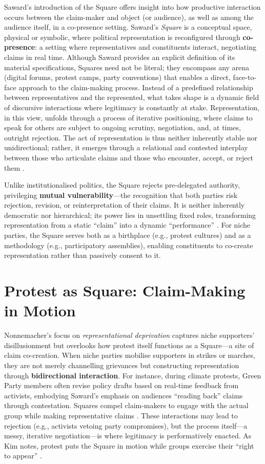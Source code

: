 Saward's introduction of the Square offers insight into how productive interaction occurs between the claim-maker and object (or audience), as well as among the audience itself, in a co-presence setting. Saward’s \textit{Square} is a conceptual space, physical or symbolic, where political representation is reconfigured through \textbf{co-presence}: a setting where representatives and constituents interact, negotiating claims in real time. Although Saward provides an explicit definition of its material specifications, Squares need not be literal; they encompass any arena (digital forums, protest camps, party conventions) that enables a direct, face-to-face approach to the claim-making process. Instead of a predefined relationship between representatives and the represented, what takes shape is a dynamic field of discursive interactions where legitimacy is constantly at stake. Representation, in this view, unfolds through a process of iterative positioning, where claims to speak for others are subject to ongoing scrutiny, negotiation, and, at times, outright rejection. The act of representation is thus neither inherently stable nor unidirectional; rather, it emerges through a relational and contested interplay between those who articulate claims and those who encounter, accept, or reject them \parencite[see 6]{kim2024}.

Unlike institutionalised politics, the Square rejects pre-delegated authority, privileging \textbf{mutual vulnerability}—the recognition that both parties risk rejection, revision, or reinterpretation of their claims. It is neither inherently democratic nor hierarchical; its power lies in unsettling fixed roles, transforming representation from a static \enquote{claim} into a dynamic \enquote{performance} \parencite[5, 11]{saward2024}. For niche parties, the Square serves both as a birthplace (e.g., protest cultures) and as a methodology (e.g., participatory assemblies), enabling constituents to co-create representation rather than passively consent to it.

\section{Protest as Square: Claim-Making in Motion}
Nonnemacher’s focus on \textit{representational deprivation} \parencite{nonnemacher2023} captures niche supporters’ disillusionment but overlooks how protest itself functions as a Square—a site of claim co-creation. When niche parties mobilise supporters in strikes or marches, they are not merely channelling grievances but constructing representation through \textbf{bidirectional interaction}. For instance, during climate protests, Green Party members often revise policy drafts based on real-time feedback from activists, embodying Saward’s emphasis on audiences \enquote{reading back} claims through contestation. Squares compel claim-makers to engage with the actual group while making representative claims \parencite[see 7]{saward2024}. These interactions may lead to rejection (e.g., activists vetoing party compromises), but the process itself—a messy, iterative negotiation—is where legitimacy is performatively enacted. As Kim notes, protest puts the Square in motion while groups exercise their \enquote{right to appear} \parencite[10]{kim2024}.

